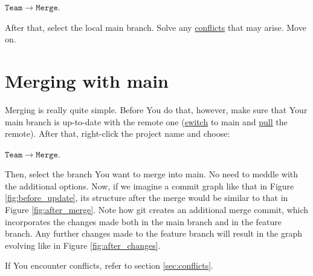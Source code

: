 \documentclass{article}
\begin{document}
$\mathtt{Team\rightarrow Merge}.$\newline

After that, select the local main branch. Solve any \hyperref[sec:conflicts]{conflicts} that may arise. Move on.

\section{Merging with main}
\label{sec:merging}
Merging is really quite simple. Before You do that, however, make sure that Your main branch is up-to-date with the remote one (\hyperref[sec:switching]{switch} to main and \hyperref[sec:pulling]{pull} the remote). After that, right-click the project name and choose:\newline

$\mathtt{Team\rightarrow Merge}$.\newline

Then, select the branch You want to merge into main. No need to meddle with the additional options. Now, if we imagine a commit graph like that in Figure \ref{fig:before_update}, its structure after the merge would be similar to that in Figure \ref{fig:after_merge}. Note how git creates an additional merge commit, which incorporates the changes made both in the main branch and in the feature branch. Any further changes made to the feature branch will result in the graph evolving like in Figure \ref{fig:after_changes}.

If You encounter conflicts, refer to section \ref{sec:conflicts}.\newline
\end{document}

